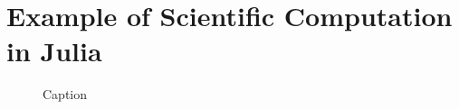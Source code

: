 \chapter{Example of Scientific Computation in Julia}
\label{app:jlscicomp}

\begin{figure}[h]
    \centering
    
    \caption{Caption}
    \label{fig:enter-label}
\end{figure}